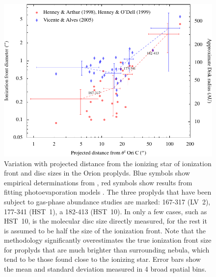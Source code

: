\documentclass[useAMS,usenatbib]{mn2e}
\begin{document}
\begin{figure}
  \centering
  \includegraphics[width=\linewidth]{prop-size-2012}
  \caption{Variation with projected distance from the ionizing star of ionization front and disc sizes in the Orion proplyds.   Blue symbols show empirical determinations from \citet{Vicente:2005}, red symbols show results from fitting photoevaporation models \citep{Henney:1998, 1999AJ....118.2350H}.   The three proplyds that have been subject to gas-phase abundance studies are marked: 167-317 (LV~2), 177-341 (HST~1), a 182-413 (HST~10).   In only a few cases, such as HST~10, is the molecular disc size directly measured, for the rest it is assumed to be half the size of the ionization front.   Note that the \citeauthor{Vicente:2005} methodology significantly overestimates the true ionization front size for proplyds that are much brighter than surrounding nebula, which tend to be those found close to the ionizing star.   Error bars show the mean and standard deviation measured in 4 broad spatial bins.   }
  \label{fig:sizes}
\end{figure}




\end{document}
